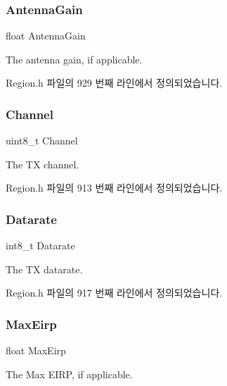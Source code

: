 \subsubsection{\texorpdfstring{Antenna\+Gain}{AntennaGain}}
{\footnotesize\ttfamily float Antenna\+Gain}

The antenna gain, if applicable. 

Region.\+h 파일의 929 번째 라인에서 정의되었습니다.

\mbox{\label{structs_tx_config_params_a1ca6f01ca18afe402de51babe8c95f5e}} 
\subsubsection{\texorpdfstring{Channel}{Channel}}
{\footnotesize\ttfamily uint8\+\_\+t Channel}

The TX channel. 

Region.\+h 파일의 913 번째 라인에서 정의되었습니다.

\mbox{\label{structs_tx_config_params_ae2f6080f3aa0e9485c55513ca56bb24d}} 
\subsubsection{\texorpdfstring{Datarate}{Datarate}}
{\footnotesize\ttfamily int8\+\_\+t Datarate}

The TX datarate. 

Region.\+h 파일의 917 번째 라인에서 정의되었습니다.

\mbox{\label{structs_tx_config_params_abacf3c28f803460c8947f0b0077fcf5c}} 
\subsubsection{\texorpdfstring{Max\+Eirp}{MaxEirp}}
{\footnotesize\ttfamily float Max\+Eirp}

The Max E\+I\+RP, if applicable. 

